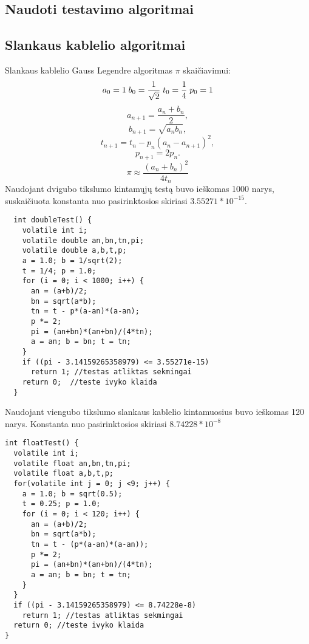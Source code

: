 \documentclass[a4paper, 12pt]{article} %
\begin{document}
\begin{onehalfspacing}
    

\newpage %

\section{Naudoti testavimo algoritmai}

\subsection{Slankaus kablelio algoritmai}
Slankaus kablelio Gauss Legendre algoritmas $\pi$ skai\v{c}iavimui:
\begin{equation*}\label{xx}
a_{0}=1\;b_{0}=\frac{1}{\sqrt{2}}\;t_{0}=\frac{1}{4}\;p_{0}=1\\
\end{equation*}
\begin{equation*}
a_{n+1} = \frac{a_n + b_n}{2},
\end{equation*}
\begin{equation*}
b_{n+1} = \sqrt{a_n b_n}, 
\end{equation*}
\begin{equation*}
t_{n+1} = t_n - p_n(a_n - a_{n+1})^2, 
\end{equation*}
\begin{equation*}
p_{n+1} = 2p_n. 
\end{equation*}
\begin{equation}
\pi \approx \frac{(a_n+b_n)^2}{4t_n}
\end{equation}
Naudojant dvigubo tikslumo kintam\k{u}j\k{u} test\k{a} buvo ie\v{s}komas 1000 narys, suskai\v{c}iuota  
konstanta nuo pasirinktosios skiriasi $3.55271 * 10^{-15}$. 
\begin{verbatim}
  int doubleTest() { 
    volatile int i; 
    volatile double an,bn,tn,pi; 
    volatile double a,b,t,p;  
    a = 1.0; b = 1/sqrt(2); 
    t = 1/4; p = 1.0; 
    for (i = 0; i < 1000; i++) { 
      an = (a+b)/2;  
      bn = sqrt(a*b); 
      tn = t - p*(a-an)*(a-an);  
      p *= 2; 
      pi = (an+bn)*(an+bn)/(4*tn);  
      a = an; b = bn; t = tn; 
    }
    if ((pi - 3.14159265358979) <= 3.55271e-15) 
      return 1; //testas atliktas sekmingai
    return 0;  //teste ivyko klaida
  } 
\end{verbatim}
Naudojant viengubo tikslumo slankaus kablelio kintamuosius buvo ie\v{s}komas 120 narys. Konstanta nuo pasirinktosios skiriasi $8.74228* 10^{-8}$
\begin{verbatim}
int floatTest() {
  volatile int i;
  volatile float an,bn,tn,pi;
  volatile float a,b,t,p;
  for(volatile int j = 0; j <9; j++) {
    a = 1.0; b = sqrt(0.5);
    t = 0.25; p = 1.0;
    for (i = 0; i < 120; i++) {
      an = (a+b)/2;
      bn = sqrt(a*b);
      tn = t - (p*(a-an)*(a-an));
      p *= 2;
      pi = (an+bn)*(an+bn)/(4*tn);
      a = an; b = bn; t = tn;
    } 
  }
  if ((pi - 3.14159265358979) <= 8.74228e-8)
    return 1; //testas atliktas sekmingai
  return 0; //teste ivyko klaida
}
\end{verbatim}

\end{onehalfspacing}
\end{document}
